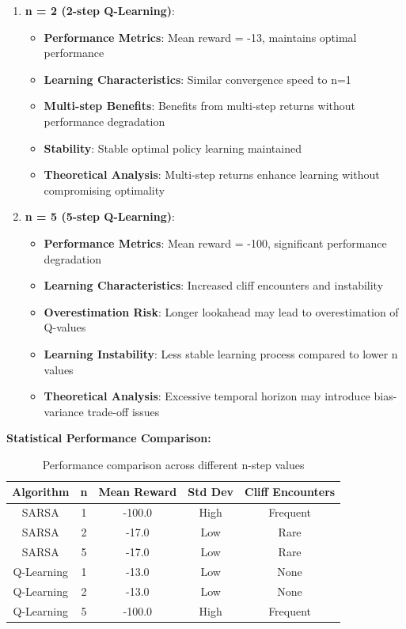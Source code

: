 \documentclass[12pt]{article}
\begin{document}
{{{\begin{enumerate}
    \item \textbf{n = 2 (2-step Q-Learning)}:
    \begin{itemize}
        \item \textbf{Performance Metrics}: Mean reward = -13, maintains optimal performance
        \item \textbf{Learning Characteristics}: Similar convergence speed to n=1
        \item \textbf{Multi-step Benefits}: Benefits from multi-step returns without performance degradation
        \item \textbf{Stability}: Stable optimal policy learning maintained
        \item \textbf{Theoretical Analysis}: Multi-step returns enhance learning without compromising optimality
    \end{itemize}
    
    \item \textbf{n = 5 (5-step Q-Learning)}:
    \begin{itemize}
        \item \textbf{Performance Metrics}: Mean reward = -100, significant performance degradation
        \item \textbf{Learning Characteristics}: Increased cliff encounters and instability
        \item \textbf{Overestimation Risk}: Longer lookahead may lead to overestimation of Q-values
        \item \textbf{Learning Instability}: Less stable learning process compared to lower n values
        \item \textbf{Theoretical Analysis}: Excessive temporal horizon may introduce bias-variance trade-off issues
    \end{itemize}
\end{enumerate}

\textbf{Statistical Performance Comparison:}

\begin{table}[h]
\centering
\begin{tabular}{|c|c|c|c|c|}
\hline
Algorithm & n & Mean Reward & Std Dev & Cliff Encounters \\
\hline
SARSA & 1 & -100.0 & High & Frequent \\
SARSA & 2 & -17.0 & Low & Rare \\
SARSA & 5 & -17.0 & Low & Rare \\
Q-Learning & 1 & -13.0 & Low & None \\
Q-Learning & 2 & -13.0 & Low & None \\
Q-Learning & 5 & -100.0 & High & Frequent \\
\hline
\end{tabular}
\caption{Performance comparison across different n-step values}
\end{table}

}}}
\end{document}

